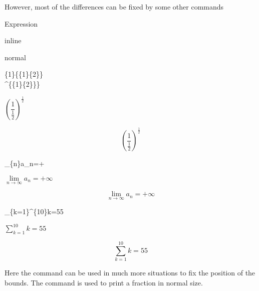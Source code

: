 \begin{frame}
	However, most of the differences can be fixed by some other commands
	\begin{example}
		\begin{minipage}{0.48\linewidth}
			\centering Expression
		\end{minipage}
		\begin{minipage}{0.24\linewidth}
			\centering inline
		\end{minipage}
		\begin{minipage}{0.24\linewidth}
			\centering normal
		\end{minipage}
		\vfill
		\begin{minipage}{0.48\linewidth}
			\{1\}\{\{1\}\{2\}\}\\
			\^{}\{\{1\}\{2\}\}\}
		\end{minipage}
		\begin{minipage}{0.24\linewidth}
			\centering $\left(\dfrac{1}{\frac{1}{2}}\right)^{\frac{1}{2}}$
		\end{minipage}
		\begin{minipage}{0.24\linewidth}
			$$\left(\dfrac{1}{\frac{1}{2}}\right)^{\frac{1}{2}}$$
		\end{minipage}
		\vfill
		\begin{minipage}{0.48\linewidth}
			\_\{n\}a\_n=+
		\end{minipage}
		\begin{minipage}{0.24\linewidth}
			\centering $\lim\limits_{n\to\infty}a_n=+\infty$
		\end{minipage}
		\begin{minipage}{0.24\linewidth}
			$$\lim\limits_{n\to\infty}a_n=+\infty$$
		\end{minipage}
		\vfill
		\begin{minipage}{0.48\linewidth}
			\_\{k=1\}\^{}\{10\}k=55
		\end{minipage}
		\begin{minipage}{0.24\linewidth}
			\centering $\sum\limits_{k=1}^{10}k=55$
		\end{minipage}
		\begin{minipage}{0.24\linewidth}
			$$\sum\limits_{k=1}^{10}k=55$$
		\end{minipage}
	\end{example}
	Here the command  can be used in much more situations to fix the position of the bounds. The command  is used to print a fraction in normal size.
\end{frame}


